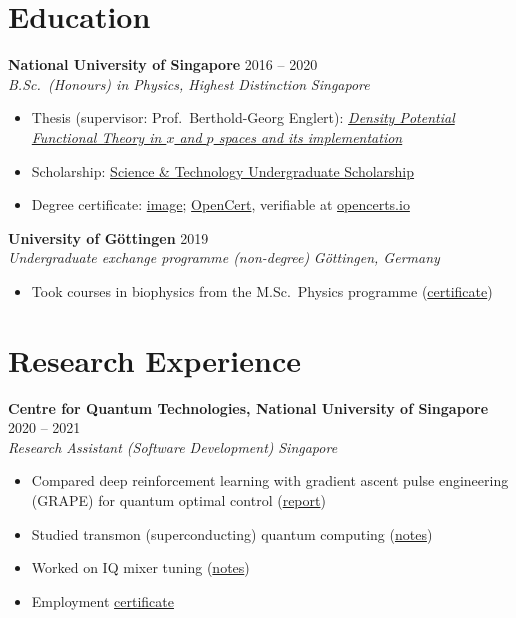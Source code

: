 \documentclass[11pt,a4paper]{article}
\newcommand{\doc}[2]{\href{https://neuroai-research.github.io/Ricky/#1}{#2}}
\newcommand{\entry}[4]{%
  \textbf{#1} \hfill #2\\
  \textit{#3} \hfill \textit{#4}\par\vspace{2pt}}
\begin{document}
\section{Education}

\entry{National University of Singapore}{2016 -- 2020}
      {B.Sc.\ (Honours) in Physics, Highest Distinction}{Singapore}
\begin{itemize}
  \item Thesis (supervisor: Prof.\ Berthold-Georg Englert):
        \doc{2020-03-01_BSc_Thesis.pdf}{\textit{Density Potential Functional
        Theory in $x$ and $p$ spaces and its implementation}}
  \item Scholarship: \href{https://nus.edu.sg/oam/scholarships/scholarships-for-freshmen-(international-students)/science-technology-undergraduate-scholarship}{Science \& Technology Undergraduate Scholarship}
  \item Degree certificate: \doc{2020-06-30_NUS.png}{image};
        \doc{2020-06-30_NUS.opencert}{OpenCert}, verifiable at
        \href{https://www.opencerts.io}{opencerts.io}
\end{itemize}
\vspace{4pt}

\entry{University of G\"ottingen}{2019}
      {Undergraduate exchange programme (non-degree)}{G\"ottingen, Germany}
\begin{itemize}
  \item Took courses in biophysics from the M.Sc.\ Physics programme
        (\doc{2019-08-06_Gottingen.pdf}{certificate})
\end{itemize}

\section{Research Experience}

\entry{Centre for Quantum Technologies, National University of Singapore}{2020 -- 2021}
      {Research Assistant (Software Development)}{Singapore}
\begin{itemize}
  \item Compared deep reinforcement learning with gradient ascent pulse
        engineering (GRAPE) for quantum optimal control
        (\doc{2020_09_01_RL_Quantum_Optimal_Control.pdf}{report})
  \item Studied transmon (superconducting) quantum computing
        (\doc{2020-06-22_Transmon_Quantum_Computer.pdf}{notes})
  \item Worked on IQ mixer tuning
        (\doc{2021_01_01_IQ_Mixer_Tuning.pdf}{notes})
  \item Employment \doc{2021-05-19_NUS_CQT_Certificate.pdf}{certificate}
\end{itemize}
\vspace{4pt}
\end{document}

